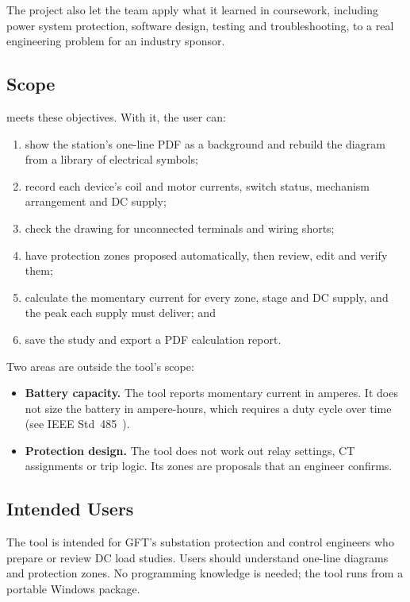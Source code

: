 The project also let the team apply what it learned in coursework, including power
system protection, software design, testing and troubleshooting, to a real
engineering problem for an industry sponsor.

\subsection{Scope}

\app{} meets these objectives. With it, the user can:

\begin{enumerate}
  \item show the station's one-line PDF as a background and rebuild the diagram from a
        library of electrical symbols;
  \item record each device's coil and motor currents, switch status, mechanism
        arrangement and DC supply;
  \item check the drawing for unconnected terminals and wiring shorts;
  \item have protection zones proposed automatically, then review, edit and verify them;
  \item calculate the momentary current for every zone, stage and DC supply, and the
        peak each supply must deliver; and
  \item save the study and export a PDF calculation report.
\end{enumerate}

Two areas are outside the tool's scope:

\begin{itemize}
  \item \textbf{Battery capacity.} The tool reports momentary current in amperes. It
        does not size the battery in ampere-hours, which requires a duty cycle over
        time (see IEEE Std~485~\cite{ieee485}).
  \item \textbf{Protection design.} The tool does not work out relay settings, CT
        assignments or trip logic. Its zones are proposals that an engineer confirms.
\end{itemize}

\subsection{Intended Users}

The tool is intended for GFT's substation protection and control engineers who prepare
or review DC load studies. Users should understand one-line diagrams and protection
zones. No programming knowledge is needed; the tool runs from a portable Windows
package.

